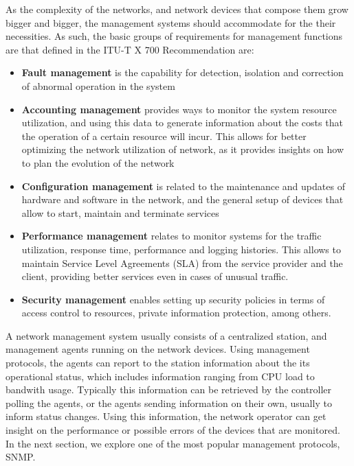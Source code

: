 \par As the complexity of the networks, and network devices that compose them grow bigger and bigger, the management systems should accommodate for the their necessities. As such, the basic groups of requirements for management 
functions are that defined in the ITU-T X 700 Recommendation \cite {CITE - ITU T Recomendation} are:

\begin {itemize}
    \item \textbf {Fault management} is the capability for detection, isolation and correction of abnormal operation in the system
    \item \textbf {Accounting management} provides ways to monitor the system resource utilization, and using this data to generate information about the costs that the operation of a certain resource will incur. This 
        allows for better optimizing the network utilization of network, as it provides insights on how to plan the evolution of the network
    \item \textbf {Configuration management} is related to the maintenance and updates of hardware and software in the network, and the general setup of devices that allow to start, maintain and terminate services 
    \item \textbf {Performance management} relates to monitor systems for the traffic utilization, response time, performance and logging histories. This allows to maintain Service Level Agreements (SLA) from the service
        provider and the client, providing better services even in cases of unusual traffic.
    \item \textbf {Security management} enables setting up security policies in terms of access control to resources, private information protection, among others.
\end {itemize}


\par A network management system usually consists of a centralized station, and management agents running on the network devices. Using management protocols, the agents can report to the station information about the its operational 
status, which includes information ranging from CPU load to bandwith usage. Typically this information can be retrieved by the controller polling the agents, or the agents sending information on their own, usually to inform
status changes. Using this information, the network operator can get insight on the performance or possible errors of the devices that are monitored. In the next section, we explore one of the most popular management protocols,
SNMP.

